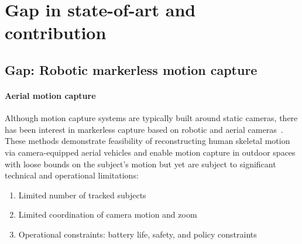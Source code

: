 \documentclass[11pt]{article}
\begin{document}

\section{Gap in state-of-art and contribution}

\subsection{Gap: Robotic markerless motion capture}

\paragraph{Aerial motion capture}


Although motion capture systems are typically
built around static cameras, there has been interest in
markerless capture based on robotic and aerial
cameras~\citep{ho2021iros,saini2022ral,saini2019iccv,hong2024eccv,zhou2018icra}.
These methods demonstrate feasibility of reconstructing human skeletal motion
via camera-equipped aerial vehicles and enable motion capture in outdoor spaces
with loose bounds on the subject's motion but yet are subject to significant
technical and operational limitations:
\begin{enumerate}[itemsep=0.3ex,topsep=0.3ex]
  \item Limited number of tracked subjects
  \item Limited coordination of camera motion and zoom
  \item Operational constraints: battery life, safety, and policy constraints
\end{enumerate}
\end{document}
